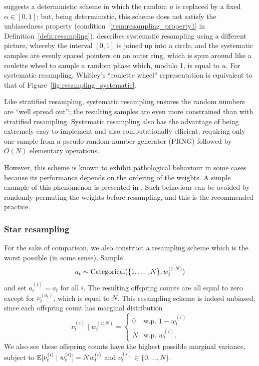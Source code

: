 \textcite{kitagawa1996} suggests a deterministic scheme in which the random $u$ is replaced by a fixed $\alpha\in[0,1]$; but, being deterministic, this scheme does not satisfy the unbiasedness property (condition~\ref{item:resampling_property1} in Definition~\ref{defn:resampling}).
\textcite{whitley1994} describes systematic resampling using a different picture, whereby the interval $[0,1]$ is joined up into a circle, and the systematic samples are evenly spaced pointers on an outer ring, which is spun around like a roulette wheel to sample a random phase which, modulo 1, is equal to $u$.
For systematic resampling, Whitley's ``roulette wheel'' representation is equivalent to that of Figure~\ref{fig:resampling_systematic}.

Like stratified resampling, systematic resampling ensures the random numbers are ``well spread out''; the resulting samples are even more constrained than with stratified resampling. 
Systematic resampling also has the advantage of being extremely easy to implement and also computationally efficient, requiring only one sample from a pseudo-random number generator (PRNG) followed by $O(N)$ elementary operations.

However, this scheme is known to exhibit pathological behaviour in some cases because its performance depends on the ordering of the weights. A simple example of this phenomenon is presented in \textcite{douc2005}. 
Such behaviour can be avoided by randomly permuting the weights before resampling, and this is the recommended practice. 



\subsubsection{Star resampling}
For the sake of comparison, we also construct a resampling scheme which is the worst possible (in some sense).
Sample
\begin{equation*}
a_t \sim \operatorname{Categorical}( \{1,\dots, N\}, w_t^{(1:N)} )
\end{equation*}
and set $a_t^{(i)} = a_t$ for all $i$.
The resulting offspring counts are all equal to zero except for $\nu_t^{(a_t)}$, which is equal to $N$.
This resampling scheme is indeed unbiased, since each offspring count has marginal distribution
\begin{equation*}
\nu_t^{(i)}  \mid w_t^{(1:N)} 
= \begin{cases}
0 & \text{w.p. } 1-w_t^{(i)} \\
N & \text{w.p. } w_t^{(i)} .
\end{cases}
\end{equation*}
We also see these offspring counts have the highest possible marginal variance, subject to $\mathbb{E}[ \nu_t^{(i)}  \mid w_t^{(i)} ] = Nw_t^{(i)}$ and $\nu_t^{(i)} \in \{0,\dots,N\}$.

